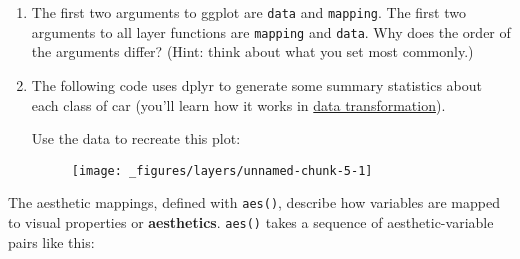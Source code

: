 \begin{enumerate}
\def\labelenumi{\arabic{enumi}.}
\item
  The first two arguments to ggplot are \texttt{data} and
  \texttt{mapping}. The first two arguments to all layer functions are
  \texttt{mapping} and \texttt{data}. Why does the order of the
  arguments differ? (Hint: think about what you set most commonly.)
\item
  The following code uses dplyr to generate some summary statistics
  about each class of car (you'll learn how it works in
  \hyperref[cha:dplyr]{data transformation}).

\begin{Shaded}
\end{Shaded}

  Use the data to recreate this plot:

  \begin{figure}[H]
    \centering
    \texttt{[image: \_figures/layers/unnamed-chunk-5-1]}
  \end{figure}
\end{enumerate}


The aesthetic mappings, defined with \texttt{aes()}, describe how
variables are mapped to visual properties or \textbf{aesthetics}.
\texttt{aes()} takes a sequence of aesthetic-variable pairs like this:
 

\begin{Shaded}
\begin{Highlighting}[]
\NormalTok{(}   
\end{Highlighting}
\end{Shaded}

